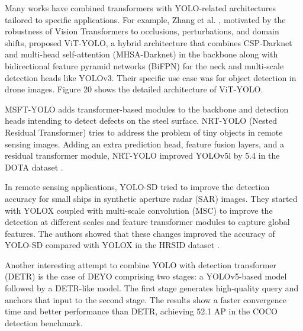 \documentclass{article}
\begin{document}
Many works have combined transformers with YOLO-related architectures tailored to specific applications. For example, Zhang et al. \cite{zhang2021vit}, motivated by the robustness of Vision Transformers to occlusions, perturbations, and domain shifts, proposed ViT-YOLO, a hybrid architecture that combines CSP-Darknet \cite{bochkovskiy2020yolov4} and multi-head self-attention (MHSA-Darknet) in the backbone along with bidirectional feature pyramid networks (BiFPN) \cite{9156454} for the neck and multi-scale detection heads like YOLOv3. Their specific use case was for object detection in drone images. Figure 20 shows the detailed architecture of ViT-YOLO.

MSFT-YOLO \cite{guo2022msft} adds transformer-based modules to the backbone and detection heads intending to detect defects on the steel surface. NRT-YOLO \cite{liu2022nrt} (Nested Residual Transformer) tries to address the problem of tiny objects in remote sensing images. Adding an extra prediction head, feature fusion layers, and a residual transformer module, NRT-YOLO improved YOLOv5l by 5.4 in the DOTA dataset \cite{xia2018dota}.

In remote sensing applications, YOLO-SD \cite{wang2022yolo} tried to improve the detection accuracy for small ships in synthetic aperture radar (SAR) images. They started with YOLOX \cite{ge2021yolox} coupled with multi-scale convolution (MSC) to improve the detection at different scales and feature transformer modules to capture global features. The authors showed that these changes improved the accuracy of YOLO-SD compared with YOLOX in the HRSID dataset \cite{wei2020hrsid}.

Another interesting attempt to combine YOLO with detection transformer (DETR) \cite{carion2020end} is the case of DEYO \cite{ouyang2022deyo} comprising two stages: a YOLOv5-based model followed by a DETR-like model. The first stage generates high-quality query and anchors that input to the second stage. The results show a faster convergence time and better performance than DETR, achieving 52.1 AP in the COCO detection benchmark.




\end{document}
